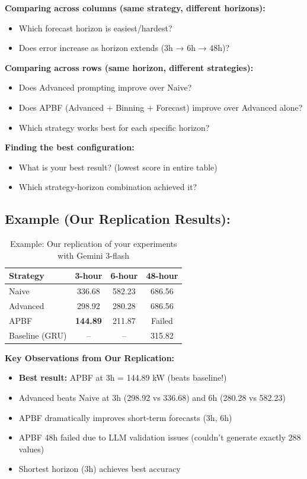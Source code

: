 \documentclass{article}
\begin{document}
\textbf{Comparing across columns (same strategy, different horizons):}
\begin{itemize}
\item Which forecast horizon is easiest/hardest?
\item Does error increase as horizon extends (3h → 6h → 48h)?
\end{itemize}

\textbf{Comparing across rows (same horizon, different strategies):}
\begin{itemize}
\item Does Advanced prompting improve over Naive?
\item Does APBF (Advanced + Binning + Forecast) improve over Advanced alone?
\item Which strategy works best for each specific horizon?
\end{itemize}

\textbf{Finding the best configuration:}
\begin{itemize}
\item What is your best result? (lowest score in entire table)
\item Which strategy-horizon combination achieved it?
\end{itemize}

\vspace{1cm}

\subsection*{Example (Our Replication Results):}

\begin{table}[h!]
\centering
\caption{Example: Our replication of your experiments with Gemini 3-flash}
\begin{tabular}{lccc}
\toprule
\textbf{Strategy} & \textbf{3-hour} & \textbf{6-hour} & \textbf{48-hour} \\
\midrule
Naive         & 336.68 & 582.23 & 686.56 \\
Advanced      & 298.92 & 280.28 & 686.56 \\
APBF          & \textbf{144.89} & 211.87 & Failed \\
\midrule
Baseline (GRU) & -- & -- & 315.82 \\
\bottomrule
\end{tabular}
\end{table}

\vspace{0.5cm}

\textbf{Key Observations from Our Replication:}
\begin{itemize}
\item \textbf{Best result:} APBF at 3h = 144.89 kW (beats baseline!)
\item Advanced beats Naive at 3h (298.92 vs 336.68) and 6h (280.28 vs 582.23)
\item APBF dramatically improves short-term forecasts (3h, 6h)
\item APBF 48h failed due to LLM validation issues (couldn't generate exactly 288 values)
\item Shortest horizon (3h) achieves best accuracy
\end{itemize}
\end{document}
